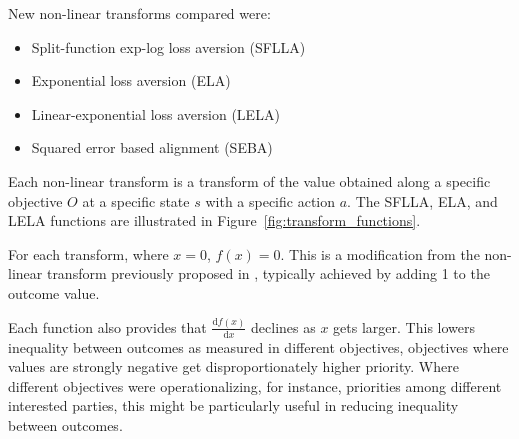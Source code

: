  New non-linear transforms compared were:

\begin{itemize}
    \item Split-function exp-log loss aversion (SFLLA)
    \item Exponential loss aversion (ELA)
    \item Linear-exponential loss aversion (LELA)
    \item Squared error based alignment (SEBA)
\end{itemize}

\noindent Each non-linear transform is a transform of the value obtained along a specific objective $O$ at a specific state $s$ with a specific action $a$. The SFLLA, ELA, and LELA functions are illustrated in Figure~\ref{fig:transform_functions}.

For each transform, where $x=0$, $f(x)=0$. This is a modification from the non-linear transform previously proposed in \cite{rolf_need_2020}, typically achieved by adding 1 to the outcome value.

Each function also provides that $\frac{\mathrm{d} f(x) }{\mathrm{d} x}$ declines as $x$ gets larger. This lowers inequality between outcomes as measured in different objectives, objectives where values are strongly negative get disproportionately higher priority. Where different objectives were operationalizing, for instance, priorities among different interested parties, this might be particularly useful in reducing inequality between outcomes.



